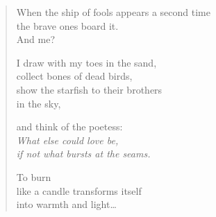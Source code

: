 \clearpage

\begin{verse}
When the ship of fools appears a second time\\
the brave ones board it.\\
And me?

I draw with my toes in the sand,\\
collect bones of dead birds,\\
show the starfish to their brothers\\
in the sky,

and think of the poetess:\\
{\itshape What else could love be,\\
if not what bursts at the seams.}

To burn\\
like a candle transforms itself\\
into warmth and light\ldots

\end{verse}
